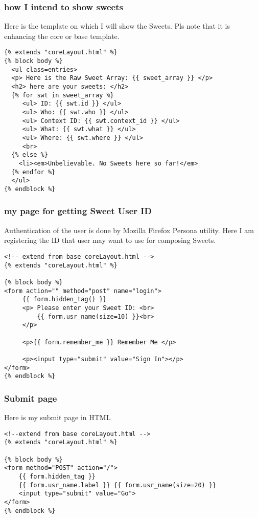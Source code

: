 \documentclass[11pt]{article}
\begin{document}
\subsubsection{how I intend to show sweets}
\label{sec-7-4-3}

Here is the template on which I will show the Sweets. Pls note that
it is enhancing the core or base template. 


\begin{verbatim}
{% extends "coreLayout.html" %}
{% block body %}
  <ul class=entries>
  <p> Here is the Raw Sweet Array: {{ sweet_array }} </p>
  <h2> here are your sweets: </h2>
  {% for swt in sweet_array %}
     <ul> ID: {{ swt.id }} </ul>
     <ul> Who: {{ swt.who }} </ul>
     <ul> Context ID: {{ swt.context_id }} </ul>
     <ul> What: {{ swt.what }} </ul>
     <ul> Where: {{ swt.where }} </ul>
     <br>
  {% else %}
    <li><em>Unbelievable. No Sweets here so far!</em>
  {% endfor %}
  </ul>
{% endblock %}
\end{verbatim}
\subsubsection{my page for getting Sweet User ID}
\label{sec-7-4-4}

Authentication of the user is done by Mozilla Firefox Persona
utility. Here I am registering the ID that user may want to use for
composing Sweets. 

\begin{verbatim}
<!-- extend from base coreLayout.html -->
{% extends "coreLayout.html" %}

{% block body %}
<form action="" method="post" name="login">
     {{ form.hidden_tag() }}
     <p> Please enter your Sweet ID: <br>
         {{ form.usr_name(size=10) }}<br>
     </p>

     <p>{{ form.remember_me }} Remember Me </p>

     <p><input type="submit" value="Sign In"></p>
</form>
{% endblock %}
\end{verbatim}
\subsubsection{Submit page}
\label{sec-7-4-5}

Here is my submit page in HTML

\begin{verbatim}
<!--extend from base coreLayout.html -->
{% extends "coreLayout.html" %}

{% block body %}
<form method="POST" action="/">
    {{ form.hidden_tag }}
    {{ form.usr_name.label }} {{ form.usr_name(size=20) }}
    <input type="submit" value="Go">
</form>
{% endblock %}
\end{verbatim}
\end{document}
